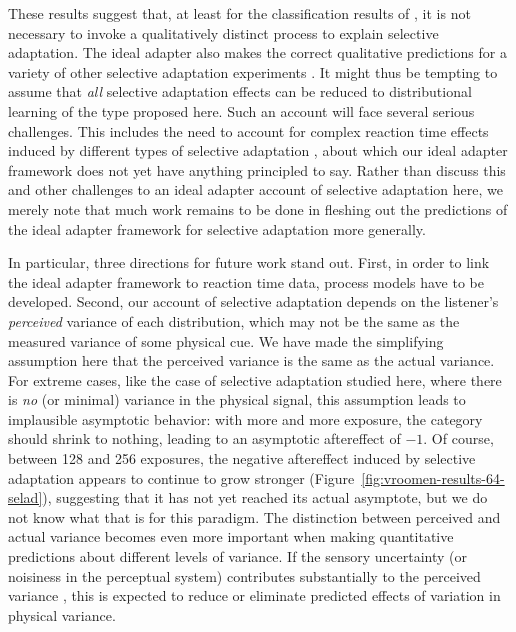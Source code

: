 These results suggest that, at least for the classification results of \textcite{Vroomen2007}, it is not necessary to invoke a qualitatively distinct process to explain selective adaptation. The ideal adapter also makes the correct qualitative predictions for a variety of other selective adaptation experiments \autocite[e.g.,][]{Eimas1973,Miller1983}.  It might thus be tempting to assume that {\em all} selective adaptation effects can be reduced to distributional learning of the type proposed here. Such an account will face several serious challenges. This includes the need to account for complex reaction time effects induced by different types of selective adaptation \autocite{Samuel1986,Samuel1996}, about which our ideal adapter framework does not yet have anything principled to say. Rather than discuss this and other challenges to an ideal adapter account of selective adaptation here, we merely note that much work remains to be done in fleshing out the predictions of the ideal adapter framework for selective adaptation more generally.

\label{r4-zerovar}
In particular, three directions for future work stand out.  First, in order to link the ideal adapter framework to reaction time data, process models have to be developed. Second, our account of selective adaptation depends on the listener's \emph{perceived} variance of each distribution, which may not be the same as the measured variance of some physical cue.  We have made the simplifying assumption here that the perceived variance is the same as the actual variance.  For extreme cases, like the case of selective adaptation studied here, where there is \emph{no} (or minimal) variance in the physical signal, this assumption leads to implausible asymptotic behavior: with more and more exposure, the category should shrink to nothing, leading to an asymptotic aftereffect of $-1$.  Of course, between 128 and 256 exposures, the negative aftereffect induced by selective adaptation appears to continue to grow stronger (Figure~\ref{fig:vroomen-results-64-selad}), suggesting that it has not yet reached its actual asymptote, but we do not know what that is for this paradigm.  The distinction between perceived and actual variance becomes even more important when making quantitative predictions about different levels of variance.  If the sensory uncertainty (or noisiness in the perceptual system) contributes substantially to the perceived variance \autocite[for preliminary evidence, see][]{Clayards2008,Feldman2009a,Kronrod2012}, this is expected to reduce or eliminate predicted effects of variation in physical variance.

